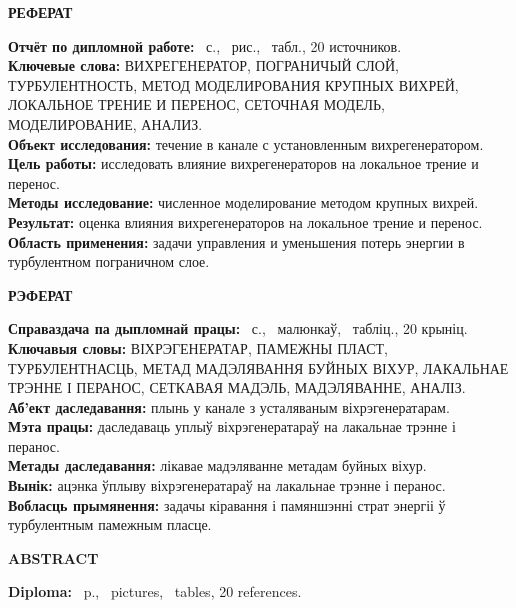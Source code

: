 \newpage
\tableofcontents
\newpage
\begin{center}
	\textbf{\MakeUppercase{реферат}}
\end{center}
\textbf{Отчёт по дипломной работе:} \pageref*{LastPage}~с., \totfig~рис., \tottab~табл., 20 источников.\\
\textbf{Ключевые слова:} \MakeUppercase{вихрегенератор, пограничый слой, турбулентность, метод моделирования крупных вихрей, локальное трение и перенос, сеточная модель, моделирование, анализ}.\\
\textbf{Объект исследования:} течение в канале с установленным вихрегенератором.\\
\textbf{Цель работы:} исследовать влияние вихрегенераторов на локальное трение и перенос.\\
\textbf{Методы исследование:} численное моделирование методом крупных вихрей.\\
\textbf{Результат:} оценка влияния вихрегенераторов на локальное трение и перенос.\\
\textbf{Область применения:} задачи управления и уменьшения потерь энергии в турбулентном пограничном слое.\\
\newpage
\begin{center}
	\textbf{\MakeUppercase{рэферат}}
\end{center}
\textbf{Справаздача па дыпломнай працы:} \pageref*{LastPage}~с., \totfig~малюнкаў, \tottab~табліц., 20 крыніц.\\
\textbf{Ключавыя словы:} \MakeUppercase{віхрэгенератар, памежны пласт, турбулентнасць, метад мадэлявання буйных віхур, лакальнае трэнне і перанос, сеткавая мадэль, мадэляванне, аналіз}.\\
\textbf{Аб'ект даследавання:} плынь у канале з усталяваным віхрэгенератарам.\\
\textbf{Мэта працы:} даследаваць уплыў віхрэгенератараў на лакальнае трэнне і перанос.\\
\textbf{Метады даследавання:} лікавае мадэляванне метадам буйных віхур.\\
\textbf{Вынік:} ацэнка ўплыву віхрэгенератараў на лакальнае трэнне і перанос.\\
\textbf{Вобласць прымянення:} задачы кіравання і памяншэнні страт энергіі ў турбулентным памежным пласце.\\
\newpage
\begin{center}
	\textbf{\MakeUppercase{abstract}}
\end{center}
\textbf{Diploma:} \pageref*{LastPage}~p., \totfig~pictures, \tottab~tables, 20 references.\\
